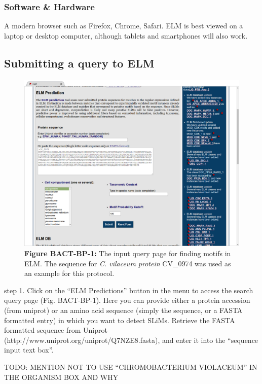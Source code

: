\subsubsection{Software \& Hardware}\label{software-hardware-1}

A modern browser such as Firefox, Chrome, Safari. ELM is best viewed on
a laptop or desktop computer, although tablets and smartphones will also
work.

\subsection{Submitting a query to ELM}\label{submitting-a-query-to-elm}

\begin{figure}[h!]
\centering
\includegraphics[width=\textwidth]{Figures/BACT_1/elm_search.png} 
\caption{
\textbf{Figure BACT-BP-1:}
The input query page for finding motifs in ELM. The sequence
for \emph{C. vilaceum protein} CV\_0974 was used as an example for this
protocol.
}
\end{figure}

step 1. Click on the ``ELM Predictions'' button in the menu to access
the search query page (Fig. BACT-BP-1). Here you can provide either a
protein accession (from uniprot) or an amino acid sequence (simply the
sequence, or a FASTA formatted entry) in which you want to detect SLiMs.
Retrieve the FASTA formatted sequence from Uniprot
(http://www.uniprot.org/uniprot/Q7NZE8.fasta), and enter it into the
``sequence input text box''.

TODO: MENTION NOT TO USE ``CHROMOBACTERIUM VIOLACEUM'' IN THE ORGANISM
BOX AND WHY

